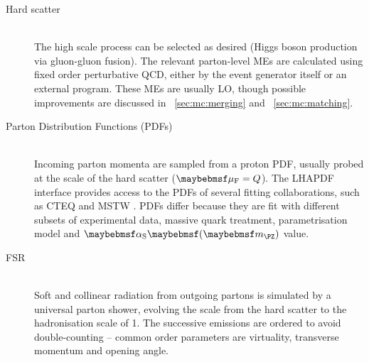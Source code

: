 \begin{description}
\item[Hard scatter] \hfill \\
	The high scale process can be selected as desired (\eg Higgs boson production via 
	gluon-gluon fusion). The relevant parton-level \acp{ME} are calculated using fixed 
	order perturbative QCD, either by the event generator itself or an external program. 
	These \acp{ME} are usually \ac{LO}, though possible improvements are discussed in 
	\Section~\ref{sec:mc:merging} and \Section~\ref{sec:mc:matching}.
\item[Parton Distribution Functions (PDFs)] \hfill \\
	Incoming parton momenta are sampled from a proton \ac{PDF}, usually probed at the 
	scale of the hard scatter ($\muf = Q$). The LHAPDF interface \cite{LHAPDF} provides 
	access to the \acp{PDF} of several fitting collaborations, such as CTEQ \cite{CTEQ} 
	and MSTW \cite{MSTW}. \acp{PDF} differ because they are fit with different subsets of 
	experimental data, massive quark treatment, parametrisation model and $\alphaS 
	\parenths{\mZ}$ value.
\item[\ac{FSR}] \hfill \\
	Soft and collinear radiation from outgoing partons is simulated by a universal parton 
	shower, evolving the scale from the hard scatter to the hadronisation scale of 
	\about\unit{1}{\GeV}. The successive emissions are ordered to avoid double-counting --
	common order parameters are virtuality, transverse momentum and opening angle.


\end{description}
